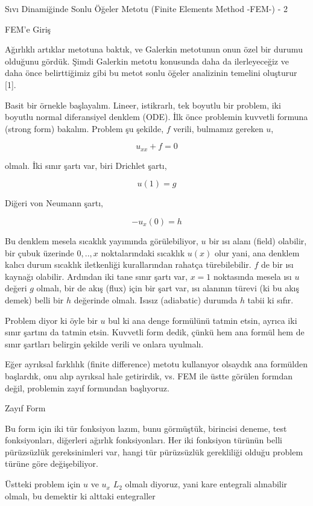 \documentclass[12pt,fleqn]{article}\usepackage{../../common}
\begin{document}
Sıvı Dinamiğinde Sonlu Öğeler Metotu (Finite Elements Method -FEM-) - 2

FEM'e Giriş

Ağırlıklı artıklar metotuna baktık, ve Galerkin metotunun onun özel bir durumu
olduğunu gördük. Şimdi Galerkin metotu konusunda daha da ilerleyeceğiz ve daha
önce belirttiğimiz gibi bu metot sonlu öğeler analizinin temelini oluşturur [1].

Basit bir örnekle başlayalım. Lineer, istikrarlı, tek boyutlu bir problem, iki
boyutlu normal diferansiyel denklem (ODE). İlk önce problemin kuvvetli formuna
(strong form) bakalım. Problem şu şekilde, $f$ verili, bulmamız gereken $u$,

$$
u_{xx} + f = 0
$$

olmalı. İki sınır şartı var, biri Drichlet şartı,

$$
u(1) = g
$$

Diğeri von Neumann şartı,

$$
-u_{x}(0) = h
$$

Bu denklem mesela sıcaklık yayımında görülebiliyor, $u$ bir ısı alanı (field)
olabilir, bir çubuk üzerinde $0,..,x$ noktalarındaki sıcaklık $u(x)$ olur yani,
ana denklem kalıcı durum sıcaklık iletkenliği kurallarından rahatça
türebilebilir. $f$ de bir ısı kaynağı olabilir. Ardından iki tane sınır şartı
var, $x=1$ noktasında mesela ısı $u$ değeri $g$ olmalı, bir de akış (flux) için
bir şart var, ısı alanının türevi (ki bu akış demek) belli bir $h$ değerinde
olmalı. Isısız (adiabatic) durumda $h$ tabii ki sıfır.

Problem diyor ki öyle bir $u$ bul ki ana denge formülünü tatmin etsin, ayrıca
iki sınır şartını da tatmin etsin. Kuvvetli form dedik, çünkü hem ana formül hem
de sınır şartları belirgin şekilde verili ve onlara uyulmalı.

Eğer ayrıksal farklılık (finite difference) metotu kullanıyor olsaydık ana
formülden başlardık, onu alıp ayrıksal hale getirirdik, vs. FEM ile üstte
görülen formdan değil, problemin zayıf formundan başlıyoruz.

Zayıf Form

Bu form için iki tür fonksiyon lazım, bunu görmüştük, birincisi deneme, test
fonksiyonları, diğerleri ağırlık fonksiyonları. Her iki fonksiyon türünün belli
pürüzsüzlük gereksinimleri var, hangi tür pürüzsüzlük gerekliliği olduğu
problem türüne göre değişebiliyor.

Üstteki problem için $u$ ve $u_x$ $L_2$ olmalı diyoruz, yani kare entegrali
alınabilir olmalı, bu demektir ki alttaki entegraller
\end{document}
